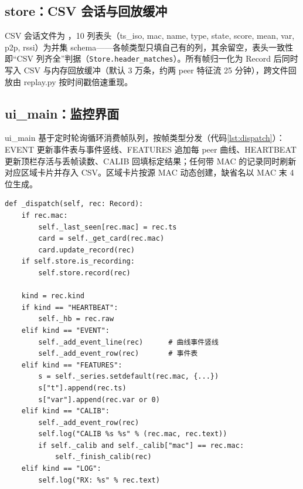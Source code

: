 \subsection{store：CSV 会话与回放缓冲}

CSV 会话文件为 ，10 列表头（ts\_iso, mac, name, type, state, score, mean, var, p2p, rssi）为并集 schema——各帧类型只填自己有的列，其余留空，表头一致性即“CSV 列齐全”判据（\texttt{Store.header\_matches}）。所有帧归一化为 Record 后同时写入 CSV 与内存回放缓冲（默认 3 万条，约两 peer 特征流 25 分钟），跨文件回放由 replay.py 按时间戳倍速重现。

\subsection{ui\_main：监控界面}

ui\_main 基于定时轮询循环消费帧队列，按帧类型分发（代码\ref{lst:dispatch}）：EVENT 更新事件表与事件竖线、FEATURES 追加每 peer 曲线、HEARTBEAT 更新顶栏存活与丢帧读数、CALIB 回填标定结果；任何带 MAC 的记录同时刷新对应区域卡片并存入 CSV。区域卡片按源 MAC 动态创建，缺省名以 MAC 末 4 位生成。

\begin{lstlisting}[style=pystyle, caption={帧分发（ui\_main.py 节选）}, label={lst:dispatch}]
def _dispatch(self, rec: Record):
    if rec.mac:
        self._last_seen[rec.mac] = rec.ts
        card = self._get_card(rec.mac)
        card.update_record(rec)
    if self.store.is_recording:
        self.store.record(rec)

    kind = rec.kind
    if kind == "HEARTBEAT":
        self._hb = rec.raw
    elif kind == "EVENT":
        self._add_event_line(rec)      # 曲线事件竖线
        self._add_event_row(rec)       # 事件表
    elif kind == "FEATURES":
        s = self._series.setdefault(rec.mac, {...})
        s["t"].append(rec.ts)
        s["var"].append(rec.var or 0)
    elif kind == "CALIB":
        self._add_event_row(rec)
        self.log("CALIB %s %s" % (rec.mac, rec.text))
        if self._calib and self._calib["mac"] == rec.mac:
            self._finish_calib(rec)
    elif kind == "LOG":
        self.log("RX: %s" % rec.text)
\end{lstlisting}
